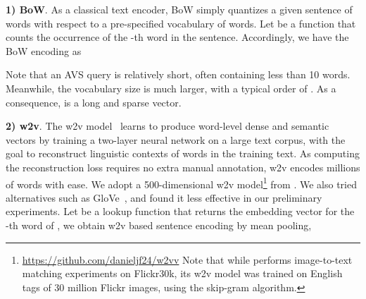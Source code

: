 \begin{table}[tb!]
\normalsize
\renewcommand\arraystretch{1}
\centering
\caption{\textbf{Five sentence encoders used in this paper}. The specific value of the vocabulary size  is dataset-dependent, which is 7,676 for MSR-VTT, 3,981 for TGIF and 2,917 for MSVD. The notation + means the vocabulary of GRU and bi-GRU is slightly bigger than  due to the inclusion of stopwords and special tokens for sequential modeling.}
\label{tab:sent-encoders}
\end{table} 
\textbf{1) BoW}. As a classical text encoder, BoW simply quantizes a given sentence  of  words with respect to a pre-specified vocabulary of  words. Let  be a function that counts the occurrence of the -th word in the sentence. Accordingly, we have the BoW encoding  as

Note that an AVS query is relatively short, often containing less than 10 words. Meanwhile, the vocabulary size is much larger, with a typical order of . As a consequence,  is a long and sparse vector. 

\textbf{2) w2v}. The w2v model~\cite{w2v} learns to produce word-level dense and semantic vectors by training a two-layer neural network on a large text corpus, with the goal to reconstruct linguistic contexts of words in the training text. As computing the reconstruction loss requires no extra manual annotation, w2v encodes millions of words with ease. We adopt a 500-dimensional w2v model\footnote{\url{https://github.com/danieljf24/w2vv} Note that while \cite{w2vv} performs image-to-text matching experiments on Flickr30k, its w2v model was trained on English tags of 30 million Flickr images, using the skip-gram algorithm.\label{w2v-flickr}} from \cite{w2vv}. 
We also tried alternatives such as GloVe~\cite{glove}, and found it less effective in our preliminary experiments. Let  be a lookup function that returns the embedding vector for the -th word of , we obtain w2v based sentence encoding by mean pooling, \ie



